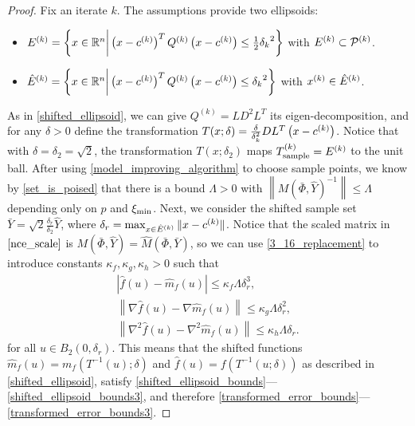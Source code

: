 \documentclass{article}
\begin{document}
\begin{proof}

Fix an iterate $k$.
The assumptions provide two ellipsoids:
\begin{itemize}
\item ${E^{(k)}} = \left\{x \in \mathbb R^n \bigg | \left(x - c^{(k)} \right)^T {Q^{(k)}} \left(x - c^{(k)}\right) \le \frac 1 2 {\delta_k}^2 \right\}$ with ${E^{(k)}} \subset {{\mathcal{P}}^{(k)}}$.
\item ${{\hat E}^{(k)}} = \left\{x \in \mathbb R^n \bigg | \left(x - c^{(k)}\right)^T {Q^{(k)}} \left(x - c^{(k)}\right) \le {\delta_k}^2 \right\}$ with $x^{(k)} \in {{\hat E}^{(k)}}$.
\end{itemize}
As in \cref{shifted_ellipsoid}, we can give $Q^{(k)} = LD^2L^T$ its eigen-decomposition, 
and for any $\delta > 0$ define the transformation $T(x; \delta) = \frac{\delta}{\delta_k^2} D L^T\left(x - c^{(k)}\right)$.
Notice that with $\delta = \delta_2 = \sqrt{2}$,
the transformation $T\left(x; \delta_2\right)$ maps ${T_{\text{sample}}^{(k)}} = {E^{(k)}}$ to the unit ball.
After using \cref{model_improving_algorithm} to choose sample points, we know by \cref{set_is_poised}
that there is a bound $\Lambda>0$ with $\left\| M\left(\bar \Phi, \hat Y\right)^{-1}\right\| \le \Lambda$ depending only on $p$ and $\xi_{\text{min}}$.
Next, we consider the shifted sample set $\bar Y = \sqrt{2}\frac{\delta_r}{\delta_2} \hat Y$, where $\delta_r = \max_{x \in {{\hat E}^{(k)}}}\|x - c^{(k)}\|$.
Notice that the scaled matrix in $\cref{nce_scale}$ is $M\left(\bar\Phi, \hat Y\right) = \hat M\left(\bar \Phi, \bar Y\right)$, so we can use \cref{3_16_replacement} to introduce constants $\kappa_f, \kappa_g, \kappa_h > 0$ such that
\begin{align*}
\left| \hat {f}\left(u\right) - \hat{m}_f\left(u\right) \right|\le \kappa_f\Lambda \delta_r^3, \\
\left\|\nabla \hat {f}\left(u\right) - \nabla \hat{m}_f\left(u\right) \right\|\le \kappa_g\Lambda \delta_r^2, \\
\left\|\nabla^2 \hat {f}\left(u\right) - \nabla^2 \hat{m}_f\left(u\right) \right\|\le \kappa_h\Lambda \delta_r.
\end{align*}
for all $u \in B_2\left(0, \delta_r\right)$.
This means that the shifted functions
$\hat {m}_f(u) = m_f(T^{-1}(u); \delta)$ and
$\hat f (u) = f(T^{-1}(u; \delta))$
as described in \cref{shifted_ellipsoid},
satisfy \cref{shifted_ellipsoid_bounds}---\cref{shifted_ellipsoid_bounds3},
and therefore \cref{transformed_error_bounds}---\cref{transformed_error_bounds3}.




\end{proof}
\end{document}
